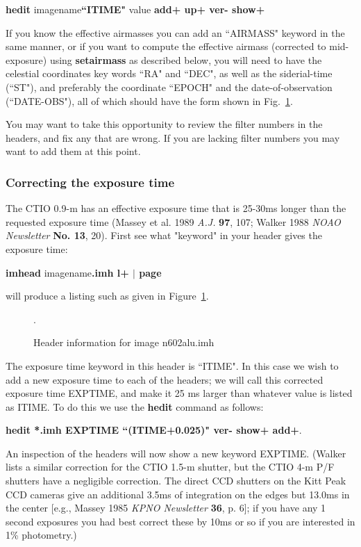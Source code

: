 \centerline{ {\bf hedit} imagename{\bf ``ITIME"} value {\bf add+ up+
ver- show+} }
 
\noindent
If you know the effective airmasses you can add an ``AIRMASS" keyword in
the same manner, or if you want to compute the effective airmass
(corrected to mid-exposure) using {\bf setairmass} as described below,
you will need to have the celestial coordinates key words ``RA" and
``DEC", as well as the siderial-time (``ST"), 
and preferably the coordinate ``EPOCH" and the date-of-observation
(``DATE-OBS"), all of which should have the form shown in Fig.~\ref{header}.

You may want to take this opportunity to review the filter numbers in the
headers, and fix any that are wrong.  If you are lacking filter numbers
you may want to add them at this point.
 
\subsubsection{Correcting the exposure time}
The CTIO 0.9-m has an effective exposure time that is
25-30ms longer than the requested exposure time (Massey et al. 1989 {\it
A.J.} {\bf 97}, 107; Walker 1988 {\it NOAO Newsletter} {\bf No. 13},
20).  First see what "keyword" in your header gives the exposure time:
 
\centerline{
{\bf imhead} imagename{\bf.imh l+ $|$ page} }
 
\noindent
will produce a listing such as
given in Figure~\ref{header}.
\begin{figure}
\vspace{3.2in}
\caption{\label{header}Header information for image n602alu.imh}.
\end{figure}
The exposure time keyword in this header is ``ITIME".  In this case
we wish to add a new exposure time to each of the headers;  we will call
this corrected exposure time
EXPTIME, and make it 25 ms larger than whatever value is listed as
ITIME.  To do this we use the {\bf hedit} command as follows:
 
\centerline{
{\bf hedit *.imh EXPTIME ``(ITIME+0.025)" ver- show+ add+}.}
 
\noindent
An inspection of the headers will now show a new keyword EXPTIME.
(Walker lists a similar correction for the CTIO 1.5-m shutter, but the
CTIO 4-m P/F shutters have a negligible correction.
The direct CCD shutters on the Kitt Peak CCD cameras give
an additional 3.5ms of integration on the edges but 13.0ms in the
center [e.g., Massey 1985 {\it KPNO Newsletter} {\bf 36}, p. 6];
if you have any 1 second exposures you had best correct these by
10ms or so if you are interested in 1\% photometry.)
  
